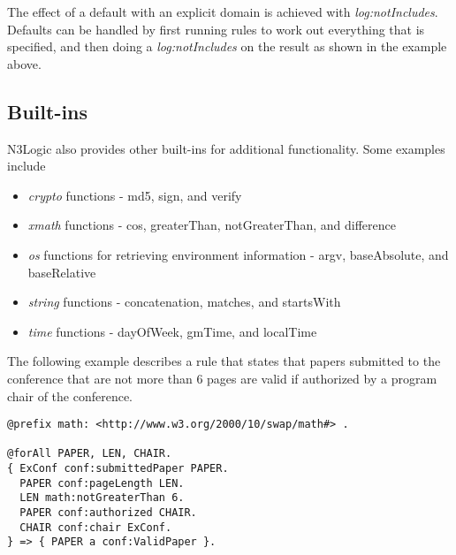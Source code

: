 \documentclass{tlp}
\begin{document}
The effect of a default with an explicit domain is achieved with {\it
  log:notIncludes}. Defaults can be handled by first running rules to
work out everything that is specified, and then doing a {\it
  log:notIncludes} on the result as shown in the example above.


\subsection{Built-ins}

N3Logic also provides other built-ins for additional
functionality. Some examples include

\begin{itemize}
\item{} {\it crypto} functions - md5, sign, and verify
\item{} {\it xmath} functions - cos, greaterThan, notGreaterThan, and
  difference
\item{} {\it os} functions for retrieving environment information -
  argv, baseAbsolute, and baseRelative
\item{} {\it string} functions - concatenation, matches, and
  startsWith
\item{} {\it time} functions - dayOfWeek, gmTime, and localTime
\end{itemize}


The following example describes a rule that states that papers
submitted to the conference that are not more than 6 pages are valid
if authorized by a program chair of the conference.

\begin{verbatim}
@prefix math: <http://www.w3.org/2000/10/swap/math#> .

@forAll PAPER, LEN, CHAIR.
{ ExConf conf:submittedPaper PAPER.
  PAPER conf:pageLength LEN.
  LEN math:notGreaterThan 6.
  PAPER conf:authorized CHAIR.
  CHAIR conf:chair ExConf.
} => { PAPER a conf:ValidPaper }.
\end{verbatim}
\end{document}
